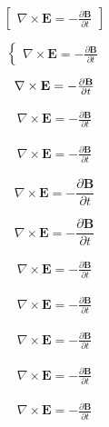 \documentclass{article}
\begin{document}
\[
\begin{bmatrix}
\nabla \times \mathbf{E} = - \frac{\partial \mathbf{B}}{\partial t}
\end{bmatrix}
\]

\[
\begin{cases}
\nabla \times \mathbf{E} = - \frac{\partial \mathbf{B}}{\partial t}
\end{cases}
\]

\[
\begin{CD}
\nabla \times \mathbf{E} = - \frac{\partial \mathbf{B}}{\partial t}
\end{CD}
\]

\begin{eqnarray}
\nabla \times \mathbf{E} = - \frac{\partial \mathbf{B}}{\partial t}
\end{eqnarray}

\begin{eqnarray*}
\nabla \times \mathbf{E} = - \frac{\partial \mathbf{B}}{\partial t}
\end{eqnarray*}

\begin{equation}
\nabla \times \mathbf{E} = - \frac{\partial \mathbf{B}}{\partial t}
\end{equation}

\begin{equation*}
\nabla \times \mathbf{E} = - \frac{\partial \mathbf{B}}{\partial t}
\end{equation*}

\begin{gather}
\nabla \times \mathbf{E} = - \frac{\partial \mathbf{B}}{\partial t}
\end{gather}

\begin{gather*}
\nabla \times \mathbf{E} = - \frac{\partial \mathbf{B}}{\partial t}
\end{gather*}

\[
\begin{gathered}
\nabla \times \mathbf{E} = - \frac{\partial \mathbf{B}}{\partial t}
\end{gathered}
\]

\[
\begin{matrix}
\nabla \times \mathbf{E} = - \frac{\partial \mathbf{B}}{\partial t}
\end{matrix}
\]

\begin{multline}
\nabla \times \mathbf{E} = - \frac{\partial \mathbf{B}}{\partial t}
\end{multline}
\end{document}

